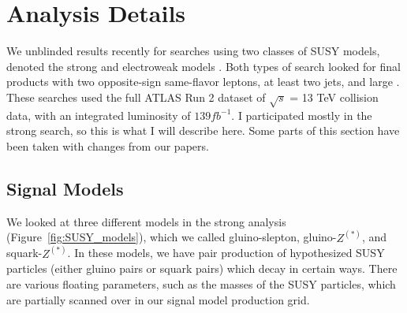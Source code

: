 \chapter{Analysis Details}

We unblinded results recently for searches using two classes of SUSY models, denoted the strong and electroweak models \cite{SUSY_2l2j}. Both types of search looked for final products with two opposite-sign same-flavor leptons, at least two jets, and large \MET. These searches used the full ATLAS Run 2 dataset of $\sqrt{s}$ = 13 TeV collision data, with an integrated luminosity of $139 fb^{-1}$. I participated mostly in the strong search, so this is what I will describe here. Some parts of this section have been taken with changes from our papers.

\section{Signal Models}

We looked at three different models in the strong analysis (Figure~\ref{fig:SUSY_models}), which we called gluino-slepton, gluino-$Z^{(*)}$, and squark-$Z^{(*)}$. In these models, we have pair production of hypothesized SUSY particles (either gluino pairs or squark pairs) which decay in certain ways. There are various floating parameters, such as the masses of the SUSY particles, which are partially scanned over in our signal model production grid.

